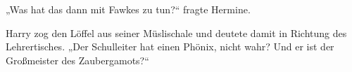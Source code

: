 „Was hat das dann mit Fawkes zu tun?“ fragte Hermine.

Harry zog den Löffel aus seiner Müslischale und deutete damit in Richtung des Lehrertisches.
„Der Schulleiter hat einen Phönix, nicht wahr? Und er ist der Großmeister des Zaubergamots?“
